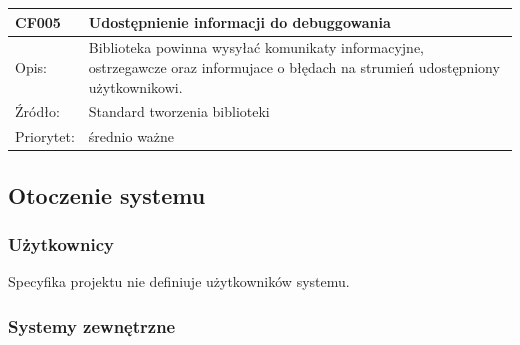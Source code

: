 \begin{center}
\begin{tabular}{|m{3cm}|m{9cm}|}
 \hline

CF005 & Udostępnienie informacji do debuggowania  \\ \hline
Opis: &  Biblioteka powinna wysyłać komunikaty informacyjne, ostrzegawcze oraz informujace o błędach na strumień udostępniony użytkownikowi.  \\ \hline
Źródło: & Standard tworzenia biblioteki 
 \\ \hline
Priorytet: & średnio ważne \\ \hline

\end{tabular}

\end{center}

\subsection{Otoczenie systemu}


\subsubsection{Użytkownicy}

Specyfika projektu nie definiuje użytkowników systemu.





\subsubsection{Systemy zewnętrzne}

